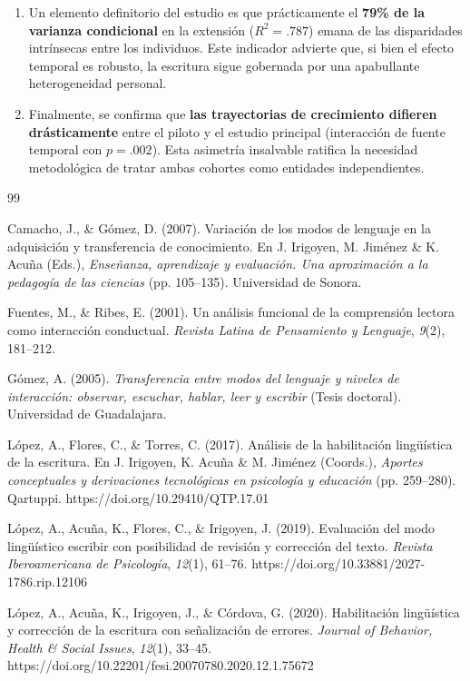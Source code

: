 \documentclass[12pt]{article}
\begin{document}
\begin{enumerate}
		\item Un elemento definitorio del estudio es que prácticamente el \textbf{79\% de la varianza condicional} en la extensión ($R^2 = .787$) emana de las disparidades intrínsecas entre los individuos. Este indicador advierte que, si bien el efecto temporal es robusto, la escritura sigue gobernada por una apabullante heterogeneidad personal.
		\item Finalmente, se confirma que \textbf{las trayectorias de crecimiento difieren drásticamente} entre el piloto y el estudio principal (interacción de fuente temporal con $p = .002$). Esta asimetría insalvable ratifica la necesidad metodológica de tratar ambas cohortes como entidades independientes.
	\end{enumerate}

\begin{thebibliography}{99}

Camacho, J., \& Gómez, D. (2007). Variación de los modos de lenguaje en la adquisición y
transferencia de conocimiento. En J. Irigoyen, M. Jiménez \& K. Acuña (Eds.),
\emph{Enseñanza, aprendizaje y evaluación. Una aproximación a la pedagogía de las ciencias}
(pp. 105--135). Universidad de Sonora.

Fuentes, M., \& Ribes, E. (2001). Un análisis funcional de la comprensión lectora como
interacción conductual. \emph{Revista Latina de Pensamiento y Lenguaje}, \emph{9}(2), 181--212.

Gómez, A. (2005). \emph{Transferencia entre modos del lenguaje y niveles de interacción:
observar, escuchar, hablar, leer y escribir} (Tesis doctoral). Universidad de Guadalajara.

López, A., Flores, C., \& Torres, C. (2017). Análisis de la habilitación lingüística de la
escritura. En J. Irigoyen, K. Acuña \& M. Jiménez (Coords.), \emph{Aportes conceptuales y
derivaciones tecnológicas en psicología y educación} (pp. 259--280). Qartuppi.
https://doi.org/10.29410/QTP.17.01

López, A., Acuña, K., Flores, C., \& Irigoyen, J. (2019). Evaluación del modo lingüístico
escribir con posibilidad de revisión y corrección del texto.
\emph{Revista Iberoamericana de Psicología}, \emph{12}(1), 61--76.
https://doi.org/10.33881/2027-1786.rip.12106

López, A., Acuña, K., Irigoyen, J., \& Córdova, G. (2020). Habilitación lingüística y
corrección de la escritura con señalización de errores. \emph{Journal of Behavior, Health \&
Social Issues}, \emph{12}(1), 33--45.
https://doi.org/10.22201/fesi.20070780.2020.12.1.75672


\end{thebibliography}
\end{document}

